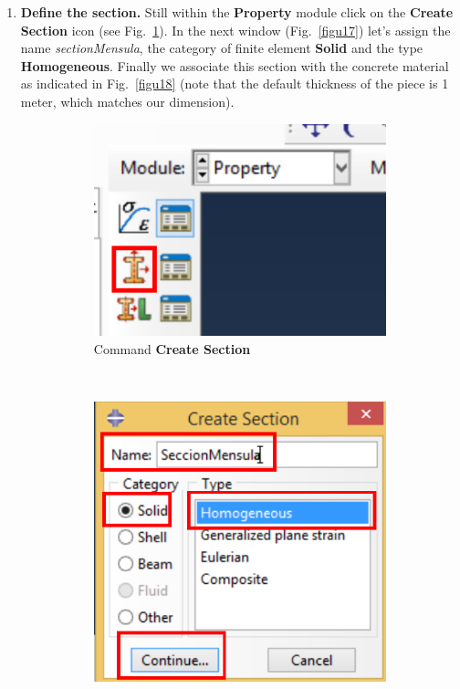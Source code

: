 \begin{enumerate}
\item \textbf{Define the section.} Still within the \textbf {Property}
  module click on the \textbf{Create Section} icon (see
  Fig.~\ref{figu16}). In the next window (Fig.~\ref{figu17}) let's
  assign the name \textit{sectionMensula}, the category of finite
  element \textbf{Solid} and the type \textbf{Homogeneous}. Finally we
  associate this section with the concrete material as indicated in
  Fig.~\ref{figu18} (note that the default thickness of the piece is 1
  meter, which matches our dimension).
  \begin{figure}[H]
    \centering
    \begin{subfigure}{0.19\textwidth}
      \includegraphics[width=\textwidth]{./body/images/imagen16.pdf}
      \caption{Command \textbf{Create Section}}
      \label{figu16}
    \end{subfigure}%
    ~ %
    \begin{subfigure}{0.39\textwidth}
      \includegraphics[width=\textwidth]{./body/images/imagen17.pdf}

\end{subfigure}
\end{figure}
\end{enumerate}
